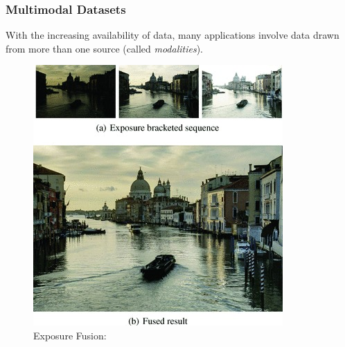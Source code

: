 \documentclass{beamer}
\begin{document}
\begin{frame}
  \frametitle{Multimodal Datasets}
  With the increasing availability of data, many applications involve data drawn from more than one source (called \emph{modalities}).
  \begin{figure}
    \hfill
    \begin{minipage}[b]{0.38\linewidth}
      \centering
      \includegraphics[width=\textwidth]{./Images/Exposure-Fusion.png}
      \caption{Exposure Fusion: \cite{Mertens2008}}
    \end{minipage}
    \hfill
    \begin{minipage}[b]{0.38\linewidth}
      \centering

\end{minipage}
\end{figure}
\end{frame}
\end{document}
